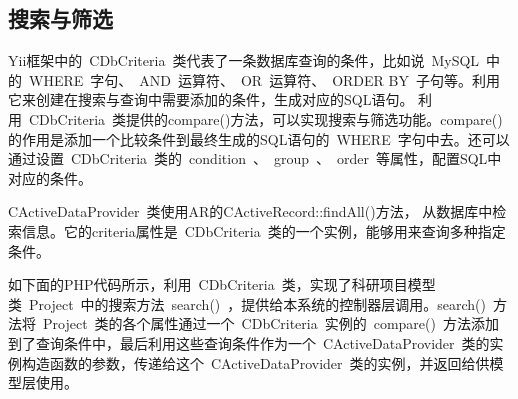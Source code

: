 \subsection{搜索与筛选}
\label{methodsearch}
Yii框架中的~CDbCriteria~类代表了一条数据库查询的条件，比如说~MySQL~中的~WHERE~字句、~AND~运算符、~OR~运算符、~ORDER BY~子句等。利用它来创建在搜索与查询中需要添加的条件，生成对应的SQL语句。
利用~CDbCriteria~类提供的compare()方法，可以实现搜索与筛选功能。compare()的作用是添加一个比较条件到最终生成的SQL语句的~WHERE~字句中去。还可以通过设置~CDbCriteria~类的~condition~、~group~、~order~等属性，配置SQL中对应的条件。

CActiveDataProvider~类使用AR的CActiveRecord::findAll()方法， 从数据库中检索信息。它的criteria属性是~CDbCriteria~类的一个实例，能够用来查询多种指定条件。

如下面的PHP代码所示，利用~CDbCriteria~类，实现了科研项目模型类~Project~中的搜索方法~search()~，提供给本系统的控制器层调用。search()~方法将~Project~类的各个属性通过一个~CDbCriteria~实例的~compare()~方法添加到了查询条件中，最后利用这些查询条件作为一个~CActiveDataProvider~类的实例构造函数的参数，传递给这个~CActiveDataProvider~类的实例，并返回给供模型层使用。



